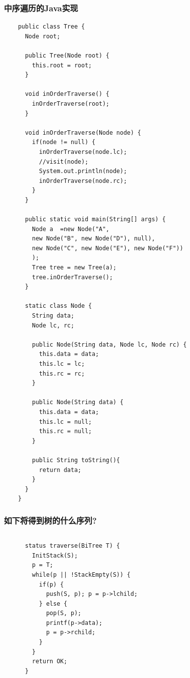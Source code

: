 \begin{frame}
  \frametitle{中序遍历的Java实现}
  \begin{verbatim}
    public class Tree {
      Node root;

      public Tree(Node root) {
        this.root = root;
      }

      void inOrderTraverse() {
        inOrderTraverse(root);
      }

      void inOrderTraverse(Node node) {
        if(node != null) {
          inOrderTraverse(node.lc);
          //visit(node);
          System.out.println(node);
          inOrderTraverse(node.rc);
        }
      }

      public static void main(String[] args) {
        Node a  =new Node("A",
        new Node("B", new Node("D"), null),
        new Node("C", new Node("E"), new Node("F"))
        );
        Tree tree = new Tree(a);
        tree.inOrderTraverse();
      }

      static class Node {
        String data;
        Node lc, rc;

        public Node(String data, Node lc, Node rc) {
          this.data = data;
          this.lc = lc;
          this.rc = rc;
        }

        public Node(String data) {
          this.data = data;
          this.lc = null;
          this.rc = null;
        }

        public String toString(){
          return data;
        }
      }
    }
  \end{verbatim}
\end{frame}
\begin{frame}[fragile]
  \frametitle{如下将得到树的什么序列?}
  \begin{columns}[T]
    \begin{verbatim}
      status traverse(BiTree T) {
        InitStack(S);
        p = T;
        while(p || !StackEmpty(S)) {
          if(p) {
            push(S, p); p = p->lchild;
          } else {
            pop(S, p);
            printf(p->data);
            p = p->rchild;
          }
        }
        return OK;
      }
    \end{verbatim}

  \end{columns}  
\end{frame}

